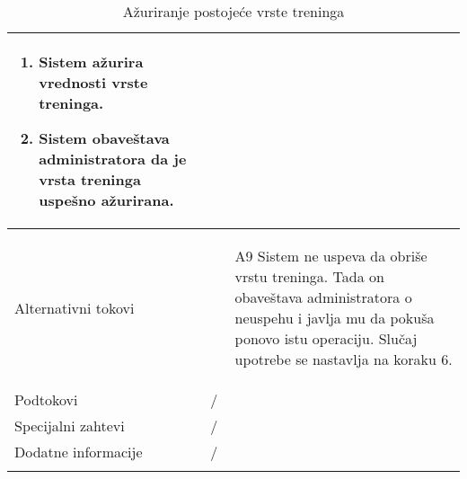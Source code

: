 \documentclass[../main.tex]{subfiles}
\begin{document}
\begin{longtable}{| p{} | p{} |}
\begin{enumerate}
        \item Sistem ažurira vrednosti vrste treninga.
        \item Sistem obaveštava administratora da je vrsta treninga uspešno ažurirana.
    \end{enumerate}\\
\hline
    Alternativni tokovi & \begin{itemize}
        \item[A9]  Sistem ne uspeva da obriše vrstu treninga. Tada on obaveštava administratora o neuspehu i javlja mu da pokuša ponovo istu operaciju. Slučaj upotrebe se nastavlja na koraku 6.

    \end{itemize}\\
\hline
    Podtokovi & /\\
\hline
    Specijalni zahtevi & /\\
\hline
    Dodatne informacije & /\\
\hline
\caption{Ažuriranje postojeće vrste treninga} %
\end{longtable}
\end{document}
